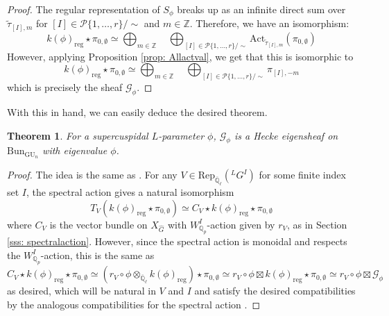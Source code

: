 \documentclass[reqno,11pt]{amsart}
\newtheorem{theorem}{Theorem}[section]
\theoremstyle{remark}
\newcommand{\GU}{\mathrm{GU}}
\newcommand{\mc}{\mathcal}
\newcommand{\Act}{\mathrm{Act}}
\newcommand{\Bun}{\mathrm{Bun}}
\newcommand{\Rep}{\mathrm{Rep}}
\newcommand{\ttau}{\tilde{\tau}}
\def\ol{\overline}
\begin{document}
\begin{proof}
The regular representation of $S_{\phi}$ breaks up as an infinite direct sum over $\ttau_{[I],m}$ for $[I] \in \mc{P}\{1,\ldots,r \}/\sim$ and $m \in \mathbb{Z}$. Therefore, we have an isomorphism:
\[ k(\phi)_{\mathrm{reg}} \star \pi_{0,\emptyset} \simeq \bigoplus_{m \in \mathbb{Z}} \quad \bigoplus_{[I] \in \mc{P}\{1,\ldots,r\}/\sim}  \Act_{\ttau_{[I],m}}(\pi_{0,\emptyset}) \]
However, applying Proposition \ref{prop: Allactval}, we get that this is isomorphic to 
\[ k(\phi)_{\mathrm{reg}} \star \pi_{0,\emptyset} \simeq \bigoplus_{m \in \mathbb{Z}} \quad \bigoplus_{[I] \in \mc{P}\{1,\ldots,r\}/\sim}  \pi_{[I],-m} \]
which is precisely the sheaf $\mathcal{G}_{\phi}$. 
\end{proof}
With this in hand, we can easily deduce the desired theorem.
\begin{theorem}{\label{thm: GUneigensheaf}}
For a supercuspidal $L$-parameter $\phi$, $\mathcal{G}_{\phi}$ is a Hecke eigensheaf on $\Bun_{\GU_{n}}$ with eigenvalue $\phi$.
\end{theorem}
\begin{proof}
The idea is the same as \cite[Proposition~7.4]{AL}. For any $V \in \Rep_{\ol{\mathbb{Q}}_{\ell}}(\phantom{}^{L}G^{I})$ for some finite index set $I$, the spectral action gives a natural isomorphism
\[ T_{V}(k(\phi)_{\mathrm{reg}} \star \pi_{0,\emptyset}) \simeq  C_{V} \star k(\phi)_{\mathrm{reg}} \star \pi_{0,\emptyset} \]
where $C_{V}$ is the vector bundle on $X_{\hat{G}}$ with $W_{\mathbb{Q}_{p}}^{I}$-action given by $r_{V}$, as in Section \ref{sss: spectralaction}. However, since the spectral action is monoidal and respects the $W_{\mathbb{Q}_{p}}^{I}$-action, this is the same as 
\[ C_{V} \star k(\phi)_{\mathrm{reg}} \star \pi_{0,\emptyset} \simeq (r_{V} \circ \phi \otimes_{\ol{\mathbb{Q}}_{\ell}} k(\phi)_{\mathrm{reg}}) \star \pi_{0,\emptyset} \simeq r_{V} \circ \phi \boxtimes k(\phi)_{\mathrm{reg}} \star \pi_{0,\emptyset} \simeq r_{V} \circ \phi \boxtimes \mathcal{G}_{\phi} \]
as desired, which will be natural in $V$ and $I$ and satisfy the desired compatibilities by the analogous compatibilities for the spectral action \cite[Corollary~IX.3]{FS}.
\end{proof}
\end{document}
